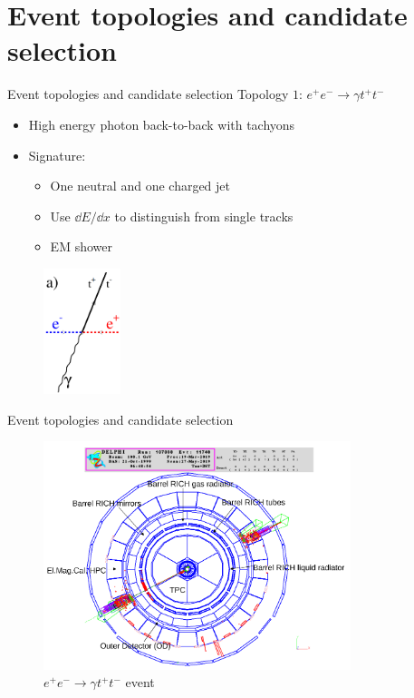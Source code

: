 \documentclass{beamer}
\begin{document}
\section{Event topologies and candidate selection}
\begin{frame}{Event topologies and candidate selection}
  Topology $1$: $e^+e^-\to\gamma t^+t^-$
  \begin{itemize}
    \item{High energy photon back-to-back with tachyons}
    \item{Signature:}
    \begin{itemize}
      \item{One neutral and one charged jet}
      \item{Use $\dd{E}/\dd{x}$ to distinguish from single tracks}
      \item{EM shower}
    \end{itemize}
  \end{itemize}
  \begin{figure}
    \centering
    \includegraphics[width = 0.2\textwidth]{TopologyA.png}
  \end{figure}
\end{frame}

\begin{frame}{Event topologies and candidate selection}
  \begin{figure}
    \centering
    \includegraphics[width = 0.8\textwidth]{Topology1.png}
    \caption{$e^+e^-\to \gamma t^+t^-$ event}
  \end{figure}
\end{frame}
\end{document}
